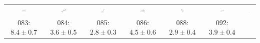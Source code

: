 \begin{tabular}{|c c c c c c c|}
\includegraphics[width = 0.14\textwidth]{2DImages/SAMPL5_050.pdf} & \includegraphics[width = 0.14\textwidth]{2DImages/SAMPL5_065.pdf} & \includegraphics[width = 0.14\textwidth]{2DImages/SAMPL5_067.pdf} & \includegraphics[width = 0.14\textwidth]{2DImages/SAMPL5_069.pdf} & \includegraphics[width = 0.14\textwidth]{2DImages/SAMPL5_074.pdf} & \includegraphics[width = 0.14\textwidth]{2DImages/SAMPL5_075.pdf} & \includegraphics[width = 0.14\textwidth]{2DImages/SAMPL5_082.pdf} \\ 
{\scriptsize 083: $ 8.4 \pm 0.7 $ } & {\scriptsize 084: $ 3.6 \pm 0.5 $ } & {\scriptsize 085: $ 2.8 \pm 0.3 $ } & {\scriptsize 086: $ 4.5 \pm 0.6 $ } & {\scriptsize 088: $ 2.9 \pm 0.4 $ } & {\scriptsize 092: $ 3.9 \pm 0.4 $ } & \\ 

\end{tabular}
